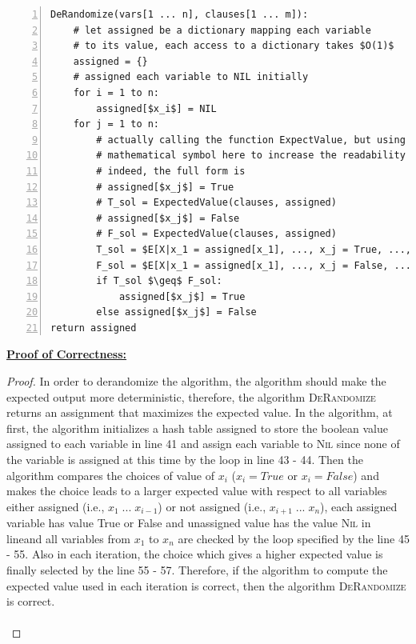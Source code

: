 \documentclass[10pt]{article}
\begin{document}
\begin{enumerate}
\begin{mdframed}
\begin{lstlisting}[mathescape=true, numbers=left]
DeRandomize(vars[1 ... n], clauses[1 ... m]):
    # let assigned be a dictionary mapping each variable
    # to its value, each access to a dictionary takes $O(1)$
    assigned = {}
    # assigned each variable to NIL initially
    for i = 1 to n:
        assigned[$x_i$] = NIL
    for j = 1 to n:
        # actually calling the function ExpectValue, but using
        # mathematical symbol here to increase the readability
        # indeed, the full form is
        # assigned[$x_j$] = True
        # T_sol = ExpectedValue(clauses, assigned)
        # assigned[$x_j$] = False
        # F_sol = ExpectedValue(clauses, assigned)
        T_sol = $E[X|x_1 = assigned[x_1], ..., x_j = True, ..., x_n = assigned[x_n]]$
        F_sol = $E[X|x_1 = assigned[x_1], ..., x_j = False, ..., x_n = assigned[x_n]]$
        if T_sol $\geq$ F_sol:
            assigned[$x_j$] = True
        else assigned[$x_j$] = False
return assigned
\end{lstlisting}
\textbf{\underline{Proof of Correctness:}}
\begin{proof}
In order to derandomize the algorithm, the algorithm should make the expected output more deterministic, therefore, the algorithm \textsc{DeRandomize} returns an assignment that maximizes the expected value. In the algorithm, at first, the algorithm initializes a hash table assigned to store the boolean value assigned to each variable in line 41 and assign each variable to \textsc{Nil} since none of the variable is assigned at this time by the loop in line 43 - 44. Then the algorithm compares the choices of value of $x_i$ ($x_i = True$ or $x_i = False$) and makes the choice leads to a larger expected value with respect to all variables either assigned (i.e., $x_1  \; ... \; x_{i - 1}$) or not assigned (i.e., $x_{i + 1} \; ... \; x_{n}$), each assigned variable has value True or False and unassigned value has the value \textsc{Nil} in lineand all variables from $x_1$ to $x_n$ are checked by the loop specified by the line 45 - 55. Also in each iteration, the choice which gives a higher expected value is finally selected by the line 55 - 57. Therefore, if the algorithm to compute the expected value used in each iteration is correct, then the algorithm \textsc{DeRandomize} is correct.\\
\\

\end{proof}
\end{mdframed}
\end{enumerate}
\end{document}
